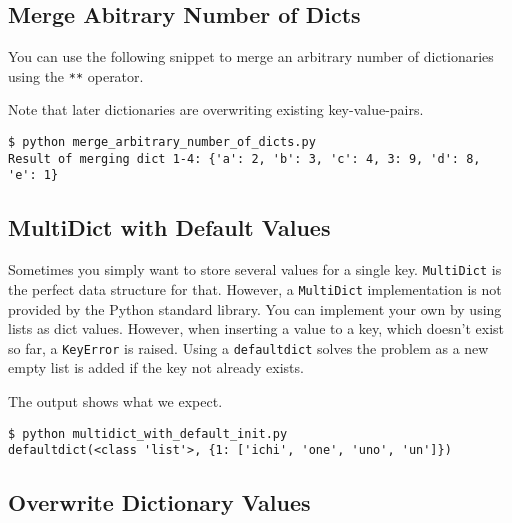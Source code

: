 


\subsection{Merge Abitrary Number of Dicts}

You can use the following snippet to merge an arbitrary number of dictionaries using the \lstinline{**} operator.



Note that later dictionaries are overwriting existing key-value-pairs.

\begin{lstlisting}[caption=Output of merge\_arbitrary\_number\_of\_dicts.py]
$ python merge_arbitrary_number_of_dicts.py
Result of merging dict 1-4: {'a': 2, 'b': 3, 'c': 4, 3: 9, 'd': 8, 'e': 1}
\end{lstlisting}


\subsection{MultiDict with Default Values}

Sometimes you simply want to store several values for a single key.
\lstinline{MultiDict} is the perfect data structure for that.
However, a \lstinline{MultiDict} implementation is not provided by the Python standard library.
You can implement your own by using lists as dict values.
However, when inserting a value to a key, which doesn't exist so far, a \lstinline{KeyError} is raised.
Using a \lstinline{defaultdict} solves the problem as a new empty list is added if the key not already exists.



The output shows what we expect.

\begin{lstlisting}[caption=Output of multidict\_with\_default\_init.py]
$ python multidict_with_default_init.py
defaultdict(<class 'list'>, {1: ['ichi', 'one', 'uno', 'un']})
\end{lstlisting}


\subsection{Overwrite Dictionary Values}

